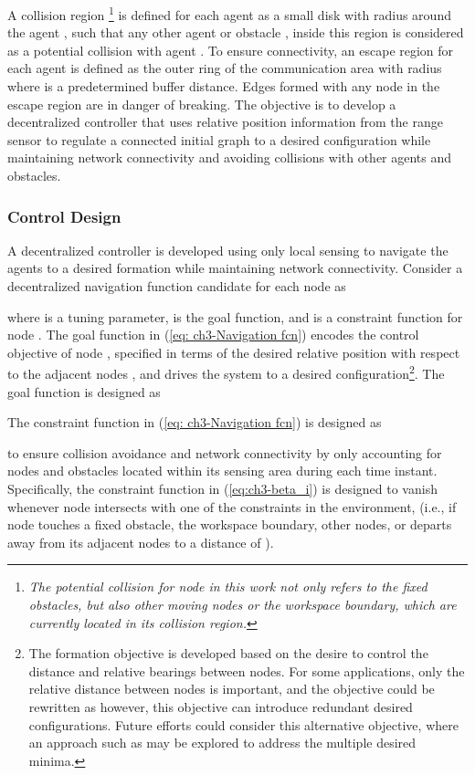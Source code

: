 \documentclass[english]{IOS-Book-Article}
\theoremstyle{definition}
\theoremstyle{definition}
\begin{document}
A collision region \textit{}\footnote{\textit{\emph{The potential collision for node  in this work not
only refers to the fixed obstacles, but also other moving nodes or
the workspace boundary, which are currently located in its collision
region.}}} is defined for each agent  as a small disk with radius 
around the agent , such that any other agent  
or obstacle  , inside this region is considered
as a potential collision with agent . To ensure connectivity,
an escape region for each agent  is defined as the outer ring
of the communication area with radius  
where  is a predetermined buffer distance.
Edges formed with any node  in the escape
region are in danger of breaking. The objective is to develop a decentralized
controller  that uses relative position information from the
range sensor to regulate a connected initial graph to a desired configuration
while maintaining network connectivity and avoiding collisions with
other agents and obstacles. 


\subsubsection{Control Design}

A decentralized controller is developed using only local sensing to
navigate the agents to a desired formation while maintaining network
connectivity. Consider a decentralized navigation function candidate
 for each node 
as

where  is a tuning parameter, 
is the goal function, and 
is a constraint function for node . The goal function 
in (\ref{eq: ch3-Navigation fcn}) encodes the control objective of
node , specified in terms of the desired relative position with
respect to the adjacent nodes ,
and drives the system to a desired configuration\footnote{The formation objective  is developed based on the desire
to control the distance and relative bearings between nodes. For some
applications, only the relative distance between nodes is important,
and the objective could be rewritten as 
however, this objective can introduce redundant desired configurations.
Future efforts could consider this alternative objective, where an
approach such as \cite{ghaffarkhah_2009} may be explored to address
the multiple desired minima.}. The goal function is designed as 

The constraint function  in (\ref{eq: ch3-Navigation fcn})
is designed as 

to ensure collision avoidance and network connectivity by only accounting
for nodes and obstacles located within its sensing area during each
time instant. Specifically, the constraint function in (\ref{eq:ch3-beta_i})
is designed to vanish whenever node  intersects with one of the
constraints in the environment, (i.e., if node  touches a fixed
obstacle, the workspace boundary, other nodes, or departs away from
its adjacent nodes  to
a distance of ). 
\end{document}
